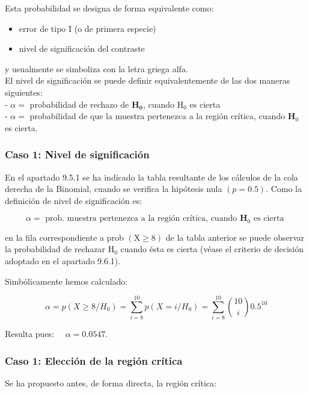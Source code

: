 \documentclass[
]{article}
\providecommand{\tightlist}{%
  \setlength{\itemsep}{0pt}\setlength{\parskip}{0pt}}
\begin{document}
Esta probabilidad se designa de forma equivalente como:

\begin{itemize}
\tightlist
\item
  error de tipo I (o de primera especie)\\
\item
  nivel de significación del contraste
\end{itemize}

y usualmente se simboliza con la letra griega alfa.\\
El nivel de significación se puede definir equivalentemente de las dos maneras siguientes:\\
- \(\alpha=\) probabilidad de rechazo de \(\mathbf{H}_{\mathbf{0}}\), cuando \(\mathrm{H}_{0}\) es cierta\\
- \(\alpha=\) probabilidad de que la muestra pertenezca a la región crítica, cuando \(\mathbf{H}_{0}\) es cierta.

\subsubsection{Caso 1: Nivel de significación}\label{caso-1-nivel-de-significaciuxf3n}

En el apartado 9.5.1 se ha indicado la tabla resultante de los cálculos de la cola derecha de la Binomial, cuando se verifica la hipótesis nula \((p=0.5)\). Como la definición de nivel de significación es:

\[
\alpha=\text { prob. muestra pertenezca a la región crítica, cuando } \mathbf{H}_{0} \text { es cierta }
\]

en la fila correspondiente a prob \((\mathrm{X} \geq 8)\) de la tabla anterior se puede observar la probabilidad de rechazar \(\mathrm{H}_{0}\) cuando ésta es cierta (véase el criterio de decisión adoptado en el apartado 9.6.1).

Simbólicamente hemos calculado:

\[
\alpha=p\left(X \geq 8 / H_{0}\right)=\sum_{i=8}^{10} p\left(X=i / H_{0}\right)=\sum_{i=8}^{10}\binom{10}{i} 0.5^{10}
\]

Resulta pues: \(\quad \alpha=0.0547\).

\subsubsection{Caso 1: Elección de la región crítica}\label{caso-1-elecciuxf3n-de-la-regiuxf3n-cruxedtica}

Se ha propuesto antes, de forma directa, la región crítica:
\end{document}
